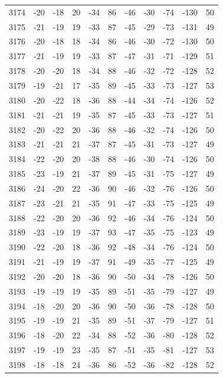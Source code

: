 \begin{table}[H]
\begin{tabular}{lllllllllll}
3174 & -20 & -18 & 20 & -34 & 86 & -46 & -30 & -74 & -130 & 50 \\
3175 & -21 & -19 & 19 & -33 & 87 & -45 & -29 & -73 & -131 & 49 \\
3176 & -20 & -18 & 18 & -34 & 86 & -46 & -30 & -72 & -130 & 50 \\
3177 & -21 & -19 & 19 & -33 & 87 & -47 & -31 & -71 & -129 & 51 \\
3178 & -20 & -20 & 18 & -34 & 88 & -46 & -32 & -72 & -128 & 52 \\
3179 & -19 & -21 & 17 & -35 & 89 & -45 & -33 & -73 & -127 & 53 \\
3180 & -20 & -22 & 18 & -36 & 88 & -44 & -34 & -74 & -126 & 52 \\
3181 & -21 & -21 & 19 & -35 & 87 & -45 & -33 & -73 & -127 & 51 \\
3182 & -20 & -22 & 20 & -36 & 88 & -46 & -32 & -74 & -126 & 50 \\
3183 & -21 & -21 & 21 & -37 & 87 & -45 & -31 & -73 & -127 & 49 \\
3184 & -22 & -20 & 20 & -38 & 88 & -46 & -30 & -74 & -126 & 50 \\
3185 & -23 & -19 & 21 & -37 & 89 & -45 & -31 & -75 & -127 & 49 \\
3186 & -24 & -20 & 22 & -36 & 90 & -46 & -32 & -76 & -126 & 50 \\
3187 & -23 & -21 & 21 & -35 & 91 & -47 & -33 & -75 & -125 & 49 \\
3188 & -22 & -20 & 20 & -36 & 92 & -46 & -34 & -76 & -124 & 50 \\
3189 & -23 & -19 & 19 & -37 & 93 & -47 & -35 & -75 & -123 & 49 \\
3190 & -22 & -20 & 18 & -36 & 92 & -48 & -34 & -76 & -124 & 50 \\
3191 & -21 & -19 & 19 & -37 & 91 & -49 & -35 & -77 & -125 & 49 \\
3192 & -20 & -20 & 18 & -36 & 90 & -50 & -34 & -78 & -126 & 50 \\
3193 & -19 & -19 & 19 & -35 & 89 & -51 & -35 & -79 & -127 & 49 \\
3194 & -18 & -20 & 20 & -36 & 90 & -50 & -36 & -78 & -128 & 50 \\
3195 & -19 & -19 & 21 & -35 & 89 & -51 & -37 & -79 & -127 & 51 \\
3196 & -18 & -20 & 22 & -34 & 88 & -52 & -36 & -80 & -128 & 52 \\
3197 & -19 & -19 & 23 & -35 & 87 & -51 & -35 & -81 & -127 & 53 \\
3198 & -18 & -18 & 24 & -36 & 86 & -52 & -36 & -82 & -128 & 52 \\

\end{tabular}
\end{table}
